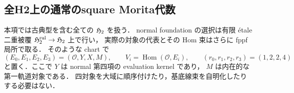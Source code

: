 \subsection{全H2上の通常のsquare Morita代数}
\label{subsec:qa-universal-h2-square-morita81}

本項では古典型を含む全ての $\mathfrak H_2$ を扱う．
normal foundation の選択は有限 \'etale 二重被覆
$\mathfrak H_2^{\mathrm{rul}}\to\mathfrak H_2$ 上で行い，
実際の対象の代表とその Hom 束はさらに fppf 局所で取る．
そのような chart で
\[
 (E_0,E_1,E_2,E_3)=(\mathcal O,Y,X,M),
 \qquad V_i=\operatorname{Hom}(\mathcal O,E_i),
 \qquad (r_0,r_1,r_2,r_3)=(1,2,2,4)
\]
と置く．ここで $Y$ は normal 第四項の evaluation kernel であり，
$M$ は内在的な第一軌道対象である．
四対象を大域に順序付けたり，基底線束を自明化したりする必要はない．

